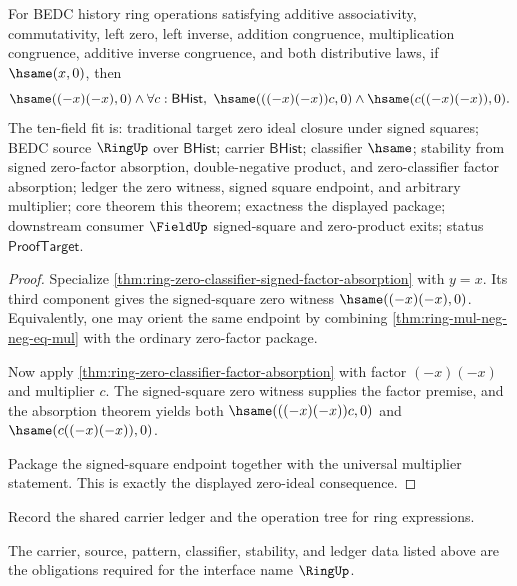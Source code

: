 \begin{theorem}
\label{thm:ring-signed-square-zero-ideal-package}
For BEDC history ring operations satisfying additive associativity,
commutativity, left zero, left inverse, addition congruence, multiplication
congruence, additive inverse congruence, and both distributive laws, if
$\hsame(x,0)$, then
$$
\hsame((-x)(-x),0)\land
\forall c:\mathsf{BHist},\
\hsame(((-x)(-x))c,0)\land\hsame(c((-x)(-x)),0).
$$
The ten-field fit is: traditional target zero ideal closure under signed
squares; BEDC source $\RingUp$ over $\mathsf{BHist}$; carrier
$\mathsf{BHist}$; classifier $\hsame$; stability from signed zero-factor
absorption, double-negative product, and zero-classifier factor absorption;
ledger the zero witness, signed square endpoint, and arbitrary multiplier;
core theorem this theorem; exactness the displayed package; downstream
consumer $\FieldUp$ signed-square and zero-product exits; status
$\mathsf{ProofTarget}$.
\end{theorem}
\begin{proof}
Specialize \autoref{thm:ring-zero-classifier-signed-factor-absorption} with
$y=x$. Its third component gives the signed-square zero witness
$\hsame((-x)(-x),0)$. Equivalently, one may orient the same endpoint by
combining \autoref{thm:ring-mul-neg-neg-eq-mul} with the ordinary zero-factor
package.

Now apply \autoref{thm:ring-zero-classifier-factor-absorption} with factor
$(-x)(-x)$ and multiplier $c$. The signed-square zero witness supplies the
factor premise, and the absorption theorem yields both
$\hsame(((-x)(-x))c,0)$ and $\hsame(c((-x)(-x)),0)$.

Package the signed-square endpoint together with the universal multiplier
statement. This is exactly the displayed zero-ideal consequence.
\end{proof}

\begin{definition}
\label{def:ring-ledger-policy}
Record the shared carrier ledger and the operation tree for ring expressions.
\end{definition}

\begin{definition}
\label{def:ring-certificate-obligations}
The carrier, source, pattern, classifier, stability, and ledger data listed above are the obligations required for the interface name \(\RingUp\).
\end{definition}

